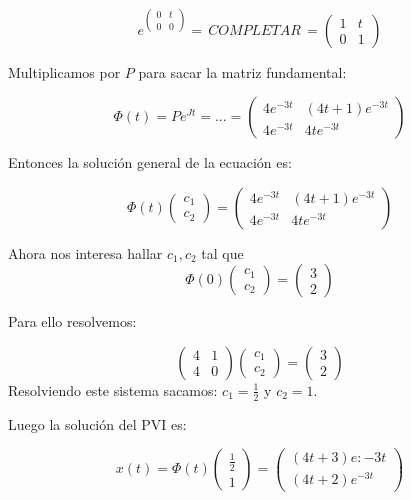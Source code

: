 \documentclass[nochap]{apuntes}
\begin{document}
\begin{problem}[25]
\[e^{\begin{pmatrix}
0&t\\0&0
\end{pmatrix}} = \,COMPLETAR\, = \begin{pmatrix}
1&t\\0&1
\end{pmatrix}\]

Multiplicamos por $P$ para sacar la matriz fundamental:

\[\Phi(t) = Pe^{Jt} = ... =  \begin{pmatrix}
4e^{-3t} & (4t+1)e^{-3t}\\4e^{-3t}&4te^{-3t}
\end{pmatrix}\]

Entonces la solución general de la ecuación es:

\[\Phi(t)\begin{pmatrix}
c_1\\c_2
\end{pmatrix} = \begin{pmatrix}
4e^{-3t} & (4t+1)e^{-3t}\\4e^{-3t}&4te^{-3t}
\end{pmatrix}\]

Ahora nos interesa hallar $c_1,c_2$ tal que \[\Phi(0)\begin{pmatrix}
c_1\\c_2
\end{pmatrix} = \begin{pmatrix}
3\\2
\end{pmatrix}\]

Para ello resolvemos:

\[\begin{pmatrix}
4&1\\4&0
\end{pmatrix}\begin{pmatrix}
c_1\\c_2
\end{pmatrix} = \begin{pmatrix}
3\\2\end{pmatrix}\]
Resolviendo este sistema sacamos: $c_1=\frac{1}{2}$ y $c_2 = 1$.

Luego la solución del PVI es:

\[x(t) = \Phi(t)\begin{pmatrix}
\frac{1}{2}\\1
\end{pmatrix} = \begin{pmatrix}
(4t+3)e:{-3t}\\(4t+2)e^{-3t}
\end{pmatrix}\]
\end{problem}
\end{document}
